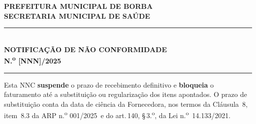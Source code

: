 \documentclass[12pt,a4paper]{article}
\newcommand{\art}[1]{art.\,#1}
\newcommand{\nncNum}{[NNN]}
\newcommand{\exercicio}{2025}
\newcommand{\arpRef}{ARP n.\textsuperscript{o} 001/2025}
\begin{document}
\setlength{\parindent}{0pt}


\begin{center}
  {\large\bfseries\color{navy}PREFEITURA MUNICIPAL DE BORBA}\\[1pt]
  {\normalsize\bfseries\color{navy}SECRETARIA MUNICIPAL DE SAÚDE}\\[0.4cm]
  \textcolor{navy!25}{\rule{0.90\linewidth}{1pt}}\\[0.4cm]
  {\LARGE\bfseries\color{warnbdr}NOTIFICAÇÃO DE NÃO CONFORMIDADE}\\[4pt]
  {\Large\bfseries N.\textsuperscript{o} \nncNum/\exercicio}\\[0.3cm]
  \textcolor{navy!25}{\rule{0.90\linewidth}{0.6pt}}
\end{center}

\vspace{0.4cm}

\begin{warnbox}
\small
Esta NNC \textbf{suspende} o prazo de recebimento definitivo e \textbf{bloqueia}
o faturamento até a substituição ou regularização dos itens apontados.
O prazo de substituição conta da data de ciência da Fornecedora, nos termos
da Cláusula~8, item~8.3 da \arpRef\ e do \art{140},
\S\,3.\textsuperscript{o}, da Lei n.\textsuperscript{o}~14.133/2021.
\end{warnbox}

\vspace{0.3cm}
\end{document}
